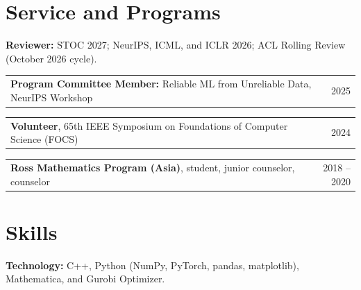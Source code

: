 \documentclass[11pt,letterpaper]{article}
\makeatletter
\newcommand{\datedline}[2]{%
  \begin{tabularx}{\textwidth}{@{}X@{\hspace{0.8em}}r@{}}
    #1 & #2
  \end{tabularx}\par
}
\newcommand{\cvitem}[2]{%
  \textbf{#1:} #2\par
}
\makeatother
\begin{document}
\section{Service and Programs}

\cvitem{Reviewer}{STOC 2027; NeurIPS, ICML, and ICLR 2026; ACL Rolling Review (October 2026 cycle).}
\datedline{\textbf{Program Committee Member:} Reliable ML from Unreliable Data, NeurIPS Workshop}{2025}
\datedline{\textbf{Volunteer}, 65th IEEE Symposium on Foundations of Computer Science (FOCS)}{2024}
\datedline{\textbf{Ross Mathematics Program (Asia)}, student, junior counselor, counselor}{2018 -- 2020}

\section{Skills}

\cvitem{Technology}{C++, Python (NumPy, PyTorch, pandas, matplotlib), Mathematica, and Gurobi Optimizer.}
\end{document}
